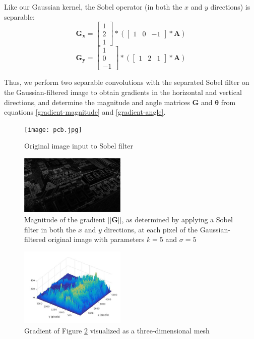 \documentclass[journal]{IEEEtran}
\begin{document}
Like our Gaussian kernel, the Sobel operator (in both the $x$ and $y$ directions) is separable:
\begin{equation}
	\label{horizontal-sobel-filter}
	\boldsymbol{G_x} =
	\begin{bmatrix}
		1 \\
		2 \\
		1
	\end{bmatrix} * 
	(\begin{bmatrix}
		1 & 0 & -1
	\end{bmatrix} * \boldsymbol{A})
\end{equation}
\begin{equation}
	\label{vertical-sobel-filter}
	\boldsymbol{G_y} =
	\begin{bmatrix}
		1 \\
		0 \\
		-1
	\end{bmatrix} * 
	(\begin{bmatrix}
		1 & 2 & 1
	\end{bmatrix} * \boldsymbol{A})
\end{equation}
\par Thus, we perform two separable convolutions with the separated Sobel filter on the Gaussian-filtered image to obtain gradients in the horizontal and vertical directions, and determine the magnitude and angle matrices $\boldsymbol{G}$ and $\boldsymbol{\theta}$ from equations \eqref{gradient-magnitude} and \eqref{gradient-angle}.
\begin{figure}[h]
	\centering
	\texttt{[image: pcb.jpg]}
	\caption{Original image input to Sobel filter}
    \label{pcb-original}
\end{figure}
\begin{figure}[h]
	\centering
	\includegraphics[width=0.45\textwidth]{sobel_pcb.jpg}
	\caption{Magnitude of the gradient $||\boldsymbol{G}||$, as determined by applying a Sobel filter in both the $x$ and $y$ directions, at each pixel of the Gaussian-filtered original image with parameters $k = 5$ and $\sigma = 5$}
    \label{sobel-pcb}
\end{figure}
\begin{figure}[h]
	\centering
	\includegraphics[width=0.45\textwidth]{sobel_pcb_mesh.jpg}
	\caption{Gradient of Figure \ref{sobel-pcb} visualized as a three-dimensional mesh}
    \label{sobel-pcb-mesh}
\end{figure}
\end{document}
